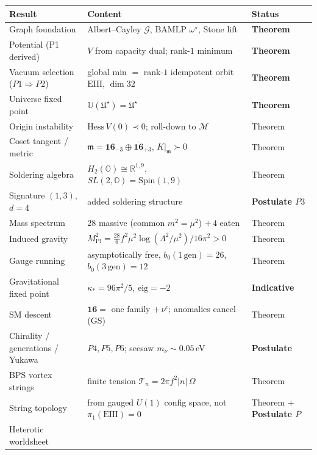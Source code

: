 \documentclass[11pt]{article}
\renewcommand{\arraystretch}{1.18}
\theoremstyle{plain}
\theoremstyle{definition}
\theoremstyle{remark}
\begin{document}
\begin{table}[h]
\centering
\renewcommand{\arraystretch}{1.25}
\begin{tabular}{lll}
\hline
\textbf{Result} & \textbf{Content} & \textbf{Status}\\
\hline
Graph foundation
  & Albert--Cayley $\mathcal{G}$, BAMLP $\omega^\star$, Stone lift
  & \textbf{Theorem}\\
Potential (P1 derived)
  & $V$ from capacity dual; rank-$1$ minimum
  & \textbf{Theorem}\\
Vacuum selection ($P1\Rightarrow P2$)
  & global min $=$ rank-$1$ idempotent orbit $\mathrm{EIII}$, $\dim 32$
  & \textbf{Theorem}\\
Universe fixed point
  & $\mathbb{U}(\mathfrak{U}^\star)=\mathfrak{U}^\star$
  & \textbf{Theorem}\\
Origin instability
  & $\mathrm{Hess}\,V(0)\prec0$; roll-down to $\mathcal{M}$
  & Theorem\\
Coset tangent / metric
  & $\mathfrak m=\mathbf{16}_{-3}\oplus\overline{\mathbf{16}}_{+3}$, $K|_{\mathfrak m}\succ0$
  & Theorem\\
Soldering algebra
  & $H_{2}(\mathbb{O})\cong\mathbb{R}^{1,9}$, $SL(2,\mathbb{O})=\mathrm{Spin}(1,9)$
  & Theorem\\
Signature $(1,3)$, $d=4$
  & added soldering structure
  & \textbf{Postulate $P3$}\\
Mass spectrum
  & $28$ massive (common $m^{2}=\mu^{2}$) $+\,4$ eaten
  & Theorem\\
Induced gravity
  & $M_{\mathrm{Pl}}^{2}=\tfrac{28}{6}f^{2}\mu^{2}\log(\Lambda^{2}/\mu^{2})/16\pi^{2}>0$
  & Theorem\\
Gauge running
  & asymptotically free, $b_{0}(1\,\mathrm{gen})=26$, $b_{0}(3\,\mathrm{gen})=12$
  & Theorem\\
Gravitational fixed point
  & $\kappa_{\ast}=96\pi^{2}/5$, $\mathrm{eig}=-2$
  & \textbf{Indicative}\\
SM descent
  & $\mathbf{16}=$ one family $+\,\nu^{c}$; anomalies cancel (GS)
  & Theorem\\
Chirality / generations / Yukawa
  & $P4,P5,P6$; seesaw $m_{\nu}\sim0.05$\,eV
  & \textbf{Postulate}\\
BPS vortex strings
  & finite tension $\mathcal{T}_{n}=2\pi f^{2}|n|\,\Omega$
  & Theorem\\
String topology
  & from gauged $U(1)$ config space, not $\pi_{1}(\mathrm{EIII})=0$
  & Theorem $+$ \textbf{Postulate $P$}\\
Heterotic worldsheet

\end{tabular}
\end{table}
\end{document}

